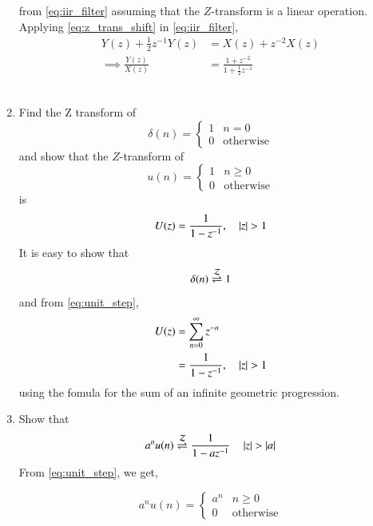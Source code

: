 \documentclass[journal,12pt,twocolumn]{IEEEtran}
\renewcommand\thesection{\arabic{section}}
\begin{document}
\begin{enumerate}[label=\thesection.\arabic*,ref=\thesection.\theenumi]
from  \eqref{eq:iir_filter} assuming that the $Z$-transform is a linear operation.\\
\solution  Applying \eqref{eq:z_trans_shift} in \eqref{eq:iir_filter},
\begin{align}
Y(z) + \frac{1}{2}z^{-1}Y(z) &= X(z)+z^{-2}X(z)
\\
\implies \frac{Y(z)}{X(z)} &= \frac{1 + z^{-2}}{1 + \frac{1}{2}z^{-1}}
\label{eq:freq_resp}
\end{align}
\ \\


\item Find the Z transform of 
\begin{equation}
\delta(n)
=
\begin{cases}
1 & n = 0
\\
0 & \text{otherwise}
\end{cases}
\end{equation}
and show that the $Z$-transform of
\begin{equation}
\label{eq:unit_step}
u(n)
=
\begin{cases}
1 & n \ge 0
\\
0 & \text{otherwise}
\end{cases}
\end{equation}
is
\begin{equation}
U(z) = \frac{1}{1-z^{-1}}, \quad \left\vert z\right\vert > 1
\end{equation}
\solution It is easy to show that
\begin{equation}
\delta(n) \overset{\mathcal{Z}}{ \rightleftharpoons} 1
\end{equation}
and from \eqref{eq:unit_step},
\begin{align}
U(z) &= \sum _{n= 0}^{\infty}z^{-n}
\\
&=\frac{1}{1-z^{-1}}, \quad \left\vert z\right\vert > 1
\end{align}
using the fomula for the sum of an infinite geometric progression.\\

\item Show that 
\begin{equation}
\label{eq:anun}
a^nu(n) \overset{\mathcal{Z}}{ \rightleftharpoons} \frac{1}{1-az^{-1}} \quad \left\vert z\right\vert > \left\vert a\right\vert
\end{equation}
\solution From \eqref{eq:unit_step}, we get,

\begin{equation}
\label{eq:anuncs}
a^nu(n)
=
\begin{cases}
a^n & n \ge 0
\\
0 & \text{otherwise}
\end{cases}
\end{equation}


\end{enumerate}
\end{document}
